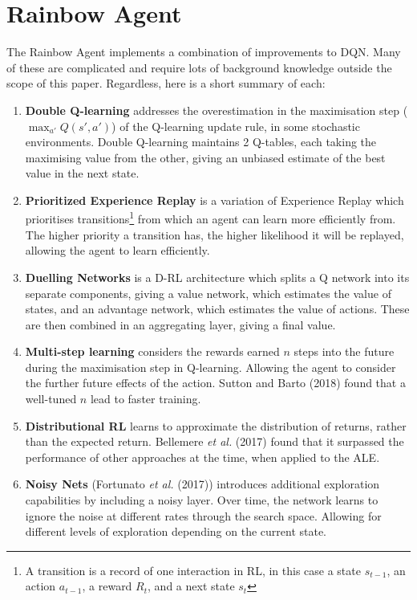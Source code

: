 \section{Rainbow Agent}
The Rainbow Agent implements a combination of improvements to DQN. Many of these are complicated and require lots of background knowledge outside the scope of this paper. Regardless, here is a short summary of each: 
\begin{enumerate}
    \item \textbf{Double Q-learning}\cite{van2016doubleq} addresses the overestimation in the maximisation step ($\max_{a'} Q(s', a')$) of the Q-learning update rule, in some stochastic environments. Double Q-learning maintains 2 Q-tables, each taking the maximising value from the other, giving an unbiased estimate of the best value in the next state.
    \item \textbf{Prioritized Experience Replay}\cite{schaul2015prioritized} is a variation of Experience Replay\cite{lin1992self} which prioritises transitions\footnote{A transition is a record of one interaction in RL, in this case a state $s_{t-1}$, an action $a_{t-1}$, a reward $R_{t}$, and a next state $s_t$} from which an agent can learn more efficiently from. The higher priority a transition has, the higher likelihood it will be replayed, allowing the agent to learn efficiently.
    \item \textbf{Duelling Networks} \cite{wang2016dueling} is a D-RL architecture which splits a Q network into its separate components, giving a value network, which estimates the value of states, and an advantage network, which estimates the value of actions. These are then combined in an aggregating layer, giving a final value.
    \item \textbf{Multi-step learning} considers the rewards earned $n$ steps into the future during the maximisation step in Q-learning. Allowing the agent to consider the further future effects of the action. Sutton and Barto (2018) \cite{sutton2018reinforcement} found that a well-tuned $n$ lead to faster training.
    \item \textbf{Distributional RL} learns to approximate the distribution of returns, rather than the expected return. Bellemere \textit{et al.} (2017)\cite{bellemare2017distributional} found that it surpassed the performance of other approaches at the time, when applied to the ALE.
    \item \textbf{Noisy Nets} (Fortunato \textit{et al.} (2017))\cite{DBLP:journals/corr/FortunatoAPMOGM17} introduces additional exploration capabilities by including a noisy layer. Over time, the network learns to ignore the noise at different rates through the search space. Allowing for different levels of exploration depending on the current state. 
\end{enumerate}
